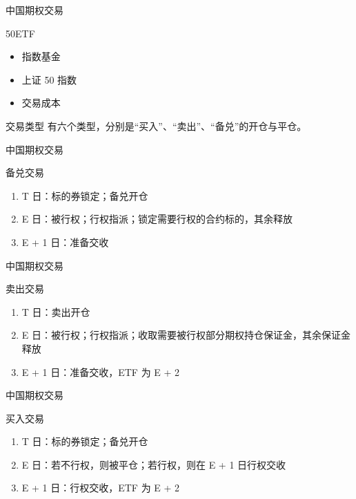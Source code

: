 \documentclass[12pt]{ctexbeamer}	%
\begin{document}
\begin{frame}{中国期权交易}
  \begin{block}{50ETF}
    \begin{itemize}
      \item 指数基金
      \item 上证 50 指数
      \item 交易成本
    \end{itemize}
  \end{block}
  \begin{block}{交易类型}
    有六个类型，分别是“买入”、“卖出”、“备兑”的开仓与平仓。
  \end{block}
\end{frame}

\begin{frame}{中国期权交易}
  \begin{block}{备兑交易}
    \begin{enumerate}
      \item T 日：标的券锁定；备兑开仓
      \item E 日：被行权；行权指派；锁定需要行权的合约标的，其余释放
      \item E + 1 日：准备交收
    \end{enumerate}
  \end{block}
\end{frame}

\begin{frame}{中国期权交易}
  \begin{block}{卖出交易}
    \begin{enumerate}
      \item T 日：卖出开仓
      \item E 日：被行权；行权指派；收取需要被行权部分期权持仓保证金，其余保证金释放
      \item E + 1 日：准备交收，ETF 为 E + 2
    \end{enumerate}
  \end{block}
\end{frame}

\begin{frame}{中国期权交易}
  \begin{block}{买入交易}
    \begin{enumerate}
      \item T 日：标的券锁定；备兑开仓
      \item E 日：若不行权，则被平仓；若行权，则在 E + 1 日行权交收
      \item E + 1 日：行权交收，ETF 为 E + 2
    \end{enumerate}
  \end{block}
\end{frame}
\end{document}
